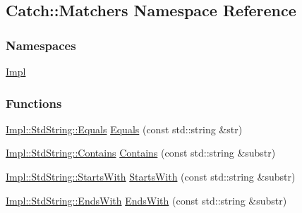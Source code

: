 \hypertarget{namespaceCatch_1_1Matchers}{\subsection{Catch\-:\-:Matchers Namespace Reference}
\label{namespaceCatch_1_1Matchers}
}
\subsubsection*{Namespaces}
\begin{DoxyCompactItemize}
\item 
\hyperlink{namespaceCatch_1_1Matchers_1_1Impl}{Impl}
\end{DoxyCompactItemize}
\subsubsection*{Functions}
\begin{DoxyCompactItemize}
\item 
\hyperlink{structCatch_1_1Matchers_1_1Impl_1_1StdString_1_1Equals}{Impl\-::\-Std\-String\-::\-Equals} \hyperlink{namespaceCatch_1_1Matchers_a57d9f348b9d9f7ee41cee43952eebb97}{Equals} (const std\-::string \&str)
\item 
\hyperlink{structCatch_1_1Matchers_1_1Impl_1_1StdString_1_1Contains}{Impl\-::\-Std\-String\-::\-Contains} \hyperlink{namespaceCatch_1_1Matchers_a5c1fcacad6845d875935cc9cfca7efb5}{Contains} (const std\-::string \&substr)
\item 
\hyperlink{structCatch_1_1Matchers_1_1Impl_1_1StdString_1_1StartsWith}{Impl\-::\-Std\-String\-::\-Starts\-With} \hyperlink{namespaceCatch_1_1Matchers_ada50a2fdca2c84cc47219835ff922d84}{Starts\-With} (const std\-::string \&substr)
\item 
\hyperlink{structCatch_1_1Matchers_1_1Impl_1_1StdString_1_1EndsWith}{Impl\-::\-Std\-String\-::\-Ends\-With} \hyperlink{namespaceCatch_1_1Matchers_a419d62cddaff9858f5a4ad0734afe8ac}{Ends\-With} (const std\-::string \&substr)
\end{DoxyCompactItemize}


